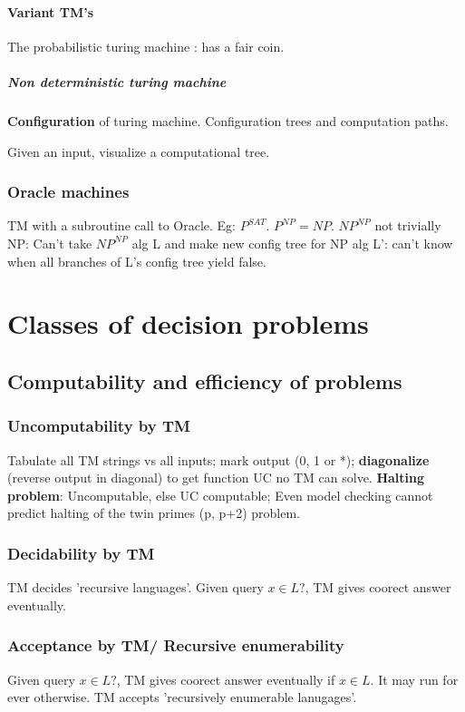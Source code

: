 \documentclass[oneside, article]{memoir}
\begin{document}
\subsection{Variant TM's}
The probabilistic turing machine : has a fair coin.

\subsubsection{Non deterministic turing machine}
\textbf{Configuration} of turing machine. Configuration trees and computation paths.

Given an input, visualize a computational tree.

\section{Oracle machines}
TM with a subroutine call to Oracle. Eg: $P^{SAT}$. $P^{NP} = NP$. $NP^{NP}$ not trivially NP: Can't take $NP^{NP}$ alg L and make new config tree for NP alg L': can't know when all branches of L's config tree yield false.

\part{Classes of decision problems}
\chapter{Computability and efficiency of problems}
\section{Uncomputability by TM}
Tabulate all TM strings vs all inputs; mark output (0, 1 or *); \textbf{diagonalize} (reverse output in diagonal) to get function UC no TM can solve. \textbf{Halting problem}: Uncomputable, else UC computable; Even model checking cannot predict halting of the twin primes (p, p+2) problem.

\section{Decidability by TM}
TM decides 'recursive languages'. Given query $x \in L?$, TM gives coorect answer eventually.

\section{Acceptance by TM/ Recursive enumerability}
Given query $x \in L?$, TM gives coorect answer eventually if $x \in L$. It may run for ever otherwise. TM accepts 'recursively enumerable lanugages'.
\end{document}
